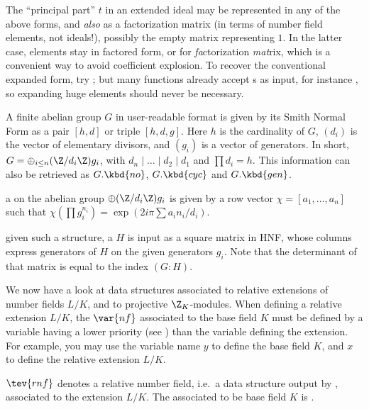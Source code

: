 The ``principal part'' $t$ in an extended ideal may be
represented in any of the above forms, and \emph{also} as a factorization
matrix (in terms of number field elements, not ideals!), possibly the empty
matrix \kbd{[;]} representing $1$. In the latter case, elements stay in
factored form, or  for \emph{fa}ctorization \emph{mat}rix, which
is a convenient way to avoid coefficient explosion. To recover the
conventional expanded form, try ; but many functions
already accept s as input, for instance , so
expanding huge elements should never be necessary.


A finite abelian group $G$ in user-readable format is given by its Smith
Normal Form as a pair $[h,d]$ or triple $[h,d,g]$.
Here $h$ is the cardinality of $G$, $(d_i)$ is the vector of elementary
divisors, and $(g_i)$ is a vector of generators. In short,
$G = \oplus_{i\leq n} (\Z/d_i\Z) g_i$, with $d_n \mid \dots \mid d_2 \mid d_1$
and $\prod d_i = h$. This information can also be retrieved as
$G.\kbd{no}$, $G.\kbd{cyc}$ and $G.\kbd{gen}$.

\item a  on the abelian group
$\oplus (\Z/d_i\Z) g_i$
is given by a row vector $\chi = [a_1,\ldots,a_n]$ such that
$\chi(\prod g_i^{n_i}) = \exp(2i\pi\sum a_i n_i / d_i)$.

\item given such a structure, a  $H$ is input as a square
matrix in HNF, whose columns express generators of $H$ on the given generators
$g_i$. Note that the determinant of that matrix is equal to the index $(G:H)$.


We now have a look at data structures associated to relative extensions
of number fields $L/K$, and to projective $\Z_K$-modules. When defining a
relative extension $L/K$, the $\var{nf}$ associated to the base field $K$
must be defined by a variable having a lower priority (see
) than the variable defining the extension. For example,
you may use the variable name $y$ to define the base field $K$, and $x$ to
define the relative extension $L/K$.

\label{se:ZKmodules}

\item $\tev{rnf}$ denotes a relative number field, i.e.~a data structure
output by , associated to the extension $L/K$. The 
associated to be base field $K$ is .

